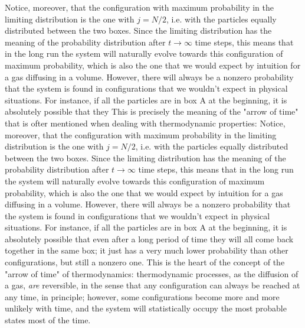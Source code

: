 Notice, moreover, that the configuration with maximum probability in the limiting distribution is the one with $j = N/2$, i.e. with the particles equally distributed between the two boxes. Since the limiting distribution has the meaning of the probability distribution after $t\rightarrow \infty$ time steps, this means that in the long run the system will naturally evolve towards this configuration of maximum probability, which is also the one that we would expect by intuition for a gas diffusing in a volume. However, there will always be a nonzero probability that the system is found in configurations that we wouldn't expect in physical situations. For instance, if all the particles are in box A at the beginning, it is absolutely possible that they  This is precisely the meaning of the "arrow of time" that is ofter mentioned when dealing with thermodynamic properties: 
Notice, moreover, that the configuration with maximum probability in the limiting distribution is the one with $j = N/2$, i.e. with the particles equally distributed between the two boxes. Since the limiting distribution has the meaning of the probability distribution after $t\rightarrow \infty$ time steps, this means that in the long run the system will naturally evolve towards this configuration of maximum probability, which is also the one that we would expect by intuition for a gas diffusing in a volume. However, there will always be a nonzero probability that the system is found in configurations that we wouldn't expect in physical situations. For instance, if all the particles are in box A at the beginning, it is absolutely possible that even after a long period of time they will all come back together in the same box; it just has a very much lower probability than other configurations, but still a nonzero one. This is the heart of the concept of the "arrow of time" of thermodynamics: thermodynamic processes, as the diffusion of a gas, \emph{are} reversible, in the sense that any configuration can always be reached at any time, in principle; however, some configurations become more and more unlikely with time, and the system will statistically occupy the most probable states most of the time. 

